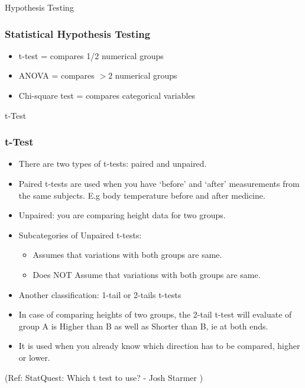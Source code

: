 \begin{frame}
\begin{center}
{\Large Hypothesis Testing}
\end{center}
\end{frame}

\begin{frame}[fragile]\frametitle{Statistical Hypothesis Testing}
\begin{itemize}
\item t-test = compares 1/2 numerical groups
\item ANOVA = compares $> 2$ numerical groups
\item Chi-square test  = compares categorical variables
\end{itemize}
\end{frame}

\begin{frame}
\begin{center}
{\Large t-Test}
\end{center}
\end{frame}

\begin{frame}[fragile]\frametitle{t-Test}

	\begin{itemize}
	
	\item There are two types of t-tests: paired and unpaired.
	\item Paired t-tests are used when you have `before' and `after' measurements from the same subjects. E.g body temperature before and after medicine.
	\item Unpaired: you are comparing height data for two groups. 
	\item Subcategories of Unpaired t-tests:
	\begin{itemize}
	\item Assumes that variations with both groups are same.
	\item Does NOT Assume that variations with both groups are same.
	\end{itemize}
	\item Another classification: 1-tail or 2-tails t-tests
	\item In case of comparing heights of two groups, the 2-tail t-test will evaluate of group A is Higher than B as well as Shorter than B, ie at both ends.
	\item It is used when you already know which direction has to be compared, higher or lower.
	\end{itemize}
  
 
\tiny{(Ref: StatQuest: Which t test to use? - Josh Starmer )}
\end{frame}

